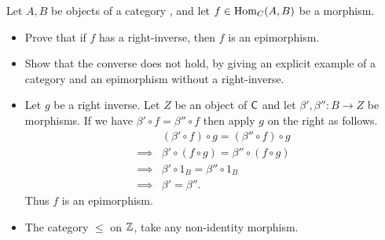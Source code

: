 \begin{exercise}
	Let \(A, B\) be objects of a category , and let \(f \in \operatorname{Hom}_C(A,B)\) be a morphism.
	\begin{itemize}
		\item Prove that if \(f\) has a right-inverse, then \(f\) is an epimorphism.
		\item Show that the converse does not hold, by giving an explicit example of a category and an epimorphism without a right-inverse.
	\end{itemize}
\end{exercise}
\begin{solution}\leavevmode
	\begin{itemize}
		\item Let $g$ be a right inverse. Let $Z$ be an object of $\textsf{C}$ and let $\beta',\beta''\colon B \to Z$ be morphisms. If we have $\beta'\circ f = \beta''\circ f$ then apply $g$ on the right as follows.
		\[
			\begin{matrix}
				&(\beta'\circ f) \circ g = (\beta''\circ f)\circ g\\[6pt]
				\implies &\beta' \circ (f\circ g) = \beta'' \circ (f\circ g)\\[6pt]
				\implies &\beta'\circ 1_B = \beta'' \circ 1_B\\[6pt]
				\implies &\beta' = \beta''.
			\end{matrix}
		\]
		Thus $f$ is an epimorphism.
		\item The category $\leq$ on $\mathbb{Z}$, take any non-identity morphism. \qedhere
	\end{itemize}
\end{solution}


